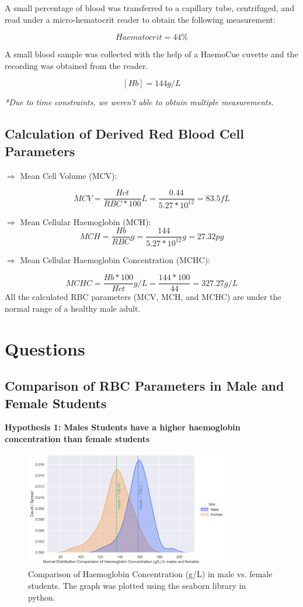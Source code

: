 \documentclass[pdflatex,sn-mathphys]{sn-jnl}%
\theoremstyle{thmstyleone}%
\theoremstyle{thmstyletwo}%
\theoremstyle{thmstylethree}%
\begin{document}
A small percentage of blood was transferred to a capillary tube, centrifuged, and read under a micro-hematocrit reader to obtain the following measurement:

\[Haematocrit = 44\%\]\vspace{0.3mm}

A small blood sample was collected with the help of a HaemoCue cuvette and the recording was obtained from the reader.

\[[Hb] =  144g/L\]\vspace{0.3mm}

\textit{*Due to time constraints, we weren't able to obtain multiple measurements.}

\subsection{Calculation of Derived Red Blood Cell Parameters}
$\Rightarrow$ Mean Cell Volume (MCV):
 
\[MCV = \frac{Hct}{RBC * 100}L =  \frac{0.44}{5.27 * 10^{12}} = 83.5 fL\]\vspace{2mm}

\noindent $\Rightarrow$ Mean Cellular Haemoglobin (MCH):
\[MCH = \frac{Hb}{RBC}g = \frac{144}{5.27 * 10^{12}}g = 27.32 pg\]\vspace{2mm}

\noindent $\Rightarrow$ Mean Cellular Haemoglobin Concentration (MCHC):

\[MCHC = \frac{Hb * 100}{Hct}g/L = \frac{144 * 100}{44} = 327.27g/L\]
All the calculated RBC parameters (MCV, MCH, and MCHC) are under the normal range of a healthy male adult.
\newpage

\section{Questions }
\subsection{Comparison of RBC Parameters in Male and Female Students}
\textbf{Hypothesis 1: Males Students have a higher haemoglobin concentration than female students}
\begin{figure}[hp]
\centering
\includegraphics[width=0.8\textwidth]{photos/hyp_1.png}
\caption{Comparison of Haemoglobin Concentration (g/L) in male vs. female students. The graph was plotted using the seaborn library in python. }\label{fig1}
\end{figure}
\vspace{-15pt}
\end{document}
